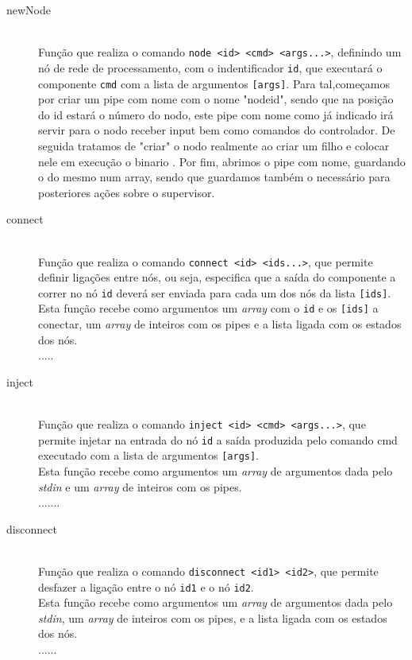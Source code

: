 \documentclass[12pt]{article}
\begin{document}
\begin{description} 
\item[newNode] \hfill \\
    Função que realiza o comando \texttt{node <id> <cmd> <args...>}, definindo um nó de rede de processamento, com o indentificador  \texttt{id}, que executará o componente \texttt{cmd} com a lista de argumentos \texttt{[args]}. Para tal,começamos por criar um pipe com nome com o nome "nodeid", sendo que na posição do id estará o número do nodo, este pipe com nome como já indicado irá servir para o nodo receber input bem como comandos do controlador. De seguida tratamos de "criar" o nodo realmente ao criar um filho e colocar nele em execução o binario . Por fim, abrimos o pipe com nome, guardando o  do mesmo num array, sendo que guardamos também o  necessário para posteriores ações sobre o supervisor.

\item[connect] \hfill \\
Função que realiza o comando \texttt{connect <id> <ids...>}, que permite definir ligações entre nós, ou seja, especifica que a saída do componente a correr no nó \texttt{id} deverá ser enviada para cada um dos nós da lista \texttt{[ids]}. 
\\Esta função recebe como argumentos um \textit{array} com o \texttt{id} e os \texttt{[ids]} a conectar, um \textit{array} de inteiros com os pipes e a lista ligada com os estados dos nós.
\\..... 

\item[inject] \hfill \\
Função que realiza o comando \texttt{inject <id> <cmd> <args...>}, que permite injetar na entrada do nó \texttt{id} a saída produzida pelo comando cmd executado com a lista de argumentos \texttt{[args]}. 
\\Esta função recebe como argumentos um \textit{array} de argumentos dada pelo \textit{stdin} e  um \textit{array} de inteiros com os pipes.
\\.......

\item[disconnect] \hfill \\
Função que realiza o comando \texttt{disconnect <id1> <id2>}, que permite desfazer a ligação entre o nó \texttt{id1} e o nó \texttt{id2}. 
\\Esta função recebe como argumentos um \textit{array} de argumentos dada pelo \textit{stdin}, um \textit{array} de inteiros com os pipes, e a lista ligada com os estados dos nós.
\\......


\end{description}
\end{document}
